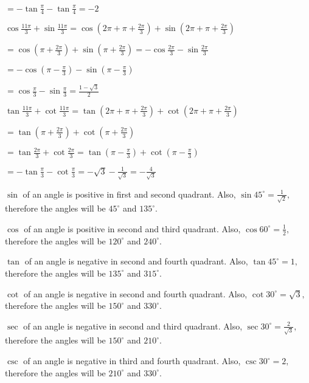   $= -\tan \frac{\pi}{4} - \tan \frac{\pi}{4} = -2$

\item $\cos\frac{11\pi}{3} + \sin \frac{11\pi}{3} = \cos\left(2\pi + \pi + \frac{2\pi}{3}\right) + \sin\left(2\pi + \pi +
  \frac{2\pi}{3}\right)$

  $= \cos\left(\pi + \frac{2\pi}{3}\right) + \sin \left(\pi + \frac{2\pi}{3}\right) = -\cos\frac{2\pi}{3} -
  \sin\frac{2\pi}{3}$

  $= -\cos\left(\pi - \frac{\pi}{3}\right) - \sin\left(\pi - \frac{\pi}{3}\right)$

  $=\cos \frac{\pi}{3} -\sin \frac{\pi}{3} = \frac{1 - \sqrt{3}}{2}$

  $\tan\frac{11\pi}{3} + \cot\frac{11\pi}{3} = \tan\left(2\pi + \pi + \frac{2\pi}{3}\right) + \cot\left(2\pi + \pi +
  \frac{2\pi}{3}\right)$

  $= \tan\left(\pi + \frac{2\pi}{3}\right) + \cot\left(\pi + \frac{2\pi}{3}\right)$

  $= \tan\frac{2\pi}{3} + \cot\frac{2\pi}{3} = \tan\left(\pi - \frac{\pi}{3}\right) + \cot(\pi - \frac{\pi}{3})$

  $= -\tan\frac{\pi}{3} -\cot\frac{\pi}{3} = -\sqrt{3} - \frac{1}{\sqrt{3}} = - \frac{4}{\sqrt{3}}$

\item $\sin$ of an angle is positive in first and second quadrant. Also, $\sin 45^\circ = \frac{1}{\sqrt{2}},$ therefore
  the angles will be $45^\circ$ and $135^\circ.$

\item $\cos$ of an angle is positive in second and third quadrant. Also, $\cos 60^\circ = \frac{1}{2},$ therefore the
  angles will be $120^\circ$ and $240^\circ.$

\item $\tan$ of an angle is negative in second and fourth quadrant. Also, $\tan 45^\circ = 1,$ therefore the angles will
  be $135^\circ$ and $315^\circ.$

\item $\cot$ of an angle is negative in second and fourth quadrant. Also, $\cot 30^\circ = \sqrt{3},$ therefore the
  angles will be $150^\circ$ and $330^\circ.$

\item $\sec$ of an angle is negative in second and third quadrant. Also, $\sec 30^\circ = \frac{2}{\sqrt{3}},$ therefore
  the angles will be $150^\circ$ and $210^\circ.$

\item $\csc$ of an angle is negative in third and fourth quadrant. Also, $\csc 30^\circ = 2,$ therefore the angles
  will be $210^\circ$ and $330^\circ.$

